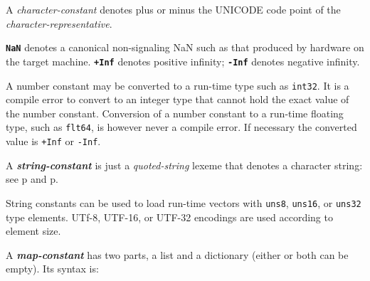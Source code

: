 \documentclass[12pt]{article}
\newcommand{\TT}[1]{{\tt \bfseries #1}}
\newcommand{\emkey}[1]{{\em \bfseries #1}}
\newcommand{\pagref}[1]{p\pageref{#1}}
\begin{document}
A {\em character-constant} denotes plus or minus
the UNICODE code point of the {\em character-representative}.

\TT{NaN} denotes a canonical non-signaling NaN such
as that produced by hardware on the target machine.
\TT{+Inf} denotes positive infinity; \TT{-Inf} denotes negative infinity.

A number constant may be converted to a run-time type such as {\tt int32}.
It is a compile error to convert to an integer type that cannot
hold the exact value of the number constant.
Conversion of a number constant
to a run-time floating type, such as {\tt flt64}, is however
never a compile error.  If necessary the converted value is
{\tt +Inf} or {\tt -Inf}.

A \emkey{string-constant} is just a {\em quoted-string} lexeme
that denotes a character string: see
\pagref{QUOTED-STRING} and \pagref{QUOTED-STRING-CONCATENATION}.

String constants can be used to load run-time vectors
with {\tt uns8}, {\tt uns16}, or {\tt uns32} type elements.
UTf-8, UTF-16, or UTF-32 encodings are used according to element
size.

A \emkey{map-constant} has two parts, a list and a dictionary
(either or both can be empty).  Its syntax is:
\end{document}
